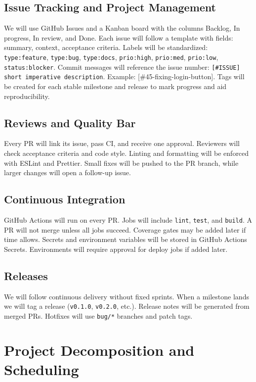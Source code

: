 \documentclass{article}
\begin{document}
\subsection*{Issue Tracking and Project Management}
We will use GitHub Issues and a Kanban board with the columns Backlog, In progress, In review, and Done. Each issue will follow a template with fields: summary, context, acceptance criteria. Labels will be standardized: \texttt{type:feature}, \texttt{type:bug}, \texttt{type:docs}, \texttt{prio:high}, \texttt{prio:med}, \texttt{prio:low}, \texttt{status:blocker}. Commit messages will reference the issue number: \texttt{[\#ISSUE] short imperative description}. Example: [\#45-fixing-login-button]. Tags will be created for each stable milestone and release to mark progress and aid reproducibility.

\subsection*{Reviews and Quality Bar}
Every PR will link its issue, pass CI, and receive one approval. Reviewers will check acceptance criteria and code style. Linting and formatting will be enforced with ESLint and Prettier. Small fixes will be pushed to the PR branch, while larger changes will open a follow-up issue.

\subsection*{Continuous Integration}
GitHub Actions will run on every PR. Jobs will include \texttt{lint}, \texttt{test}, and \texttt{build}. A PR will not merge unless all jobs succeed. Coverage gates may be added later if time allows. Secrets and environment variables will be stored in GitHub Actions Secrets. Environments will require approval for deploy jobs if added later.

\subsection*{Releases}
We will follow continuous delivery without fixed sprints. When a milestone lands we will tag a release (\texttt{v0.1.0}, \texttt{v0.2.0}, etc.). Release notes will be generated from merged PRs. Hotfixes will use \texttt{bug/*} branches and patch tags.

\section{Project Decomposition and Scheduling}
\end{document}
